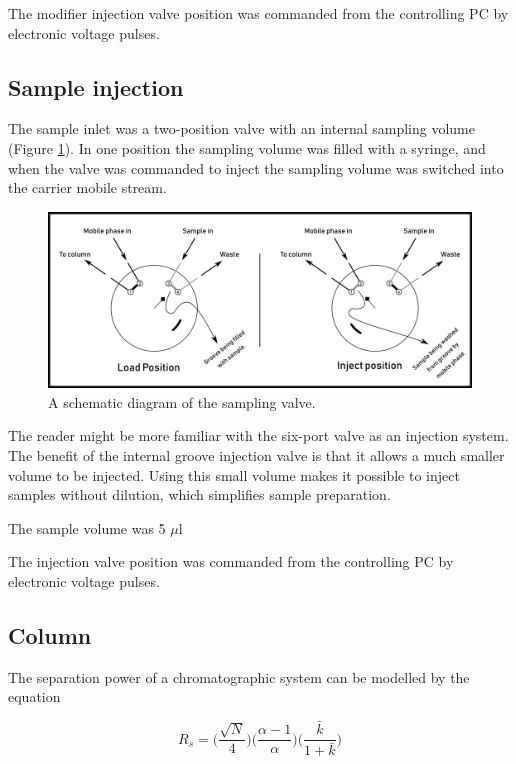 The modifier injection valve position was commanded from the controlling PC by electronic
voltage pulses.

\subsection{Sample injection}

The sample inlet was a two-position valve with an internal sampling volume
(Figure \ref{fig:samplingvalve}). In one position the sampling volume was filled
with a syringe, and when the valve was commanded to inject the sampling volume
was switched into the carrier mobile stream.

\begin{figure}
\centering
\includegraphics[width=\textwidth]{Figures/SampleValve.pdf}
\decoRule

\caption[Schematic diagram of the injection valve.]{A schematic diagram of the sampling valve. }

\label{fig:samplingvalve}
\end{figure}

The reader might be more familiar with the six-port valve as an injection
system. The benefit of the internal groove injection valve is that it allows a
much smaller volume to be injected. Using this small volume makes it possible to
inject samples without dilution, which simplifies sample preparation.

The sample volume was 5 $\mu$l

The injection valve position was commanded from the controlling PC by electronic
voltage pulses.

\subsection{Column}

The separation power of a chromatographic system can be modelled by the equation 

\begin{equation}
R_s = \bigg(\frac{\sqrt{N}}{4}\bigg)  \bigg(\frac{\alpha-1}{\alpha}\bigg)  \bigg(\frac{\bar{k}}{1+\bar{k}}\bigg)
\end{equation}

